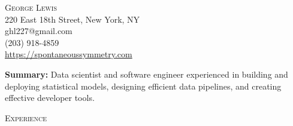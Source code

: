 \documentclass[9pt]{article}
\newenvironment{changemargin}[2]{%
  \begin{list}{}{%
    \setlength{\topsep}{0pt}%
    \setlength{\leftmargin}{#1}%
    \setlength{\rightmargin}{#2}%
    \setlength{\listparindent}{\parindent}%
    \setlength{\itemindent}{\parindent}%
    \setlength{\parsep}{\parskip}%
  }%
  \item[]}{\end{list}
}
\newcommand{\lineover}{
  \begin{changemargin}{-0.05in}{-0.05in}
    \vspace*{-8pt}
    \hrulefill \\
    \vspace*{-2pt}
  \end{changemargin}
}
\newcommand{\header}[1]{
  \begin{changemargin}{-0.5in}{-0.5in}
    \scshape{#1}
    \lineover
  \end{changemargin}
}
\newcommand{\contact}[5]{
  \begin{changemargin}{-0.5in}{-0.5in}
    \begin{center}
      {\Large \scshape {#1}} \\ \smallskip
      {#2} \\ \smallskip
      {#3} \\ \smallskip
      {#4} \\ \smallskip
      {#5} \\ \smallskip
    \end{center}
  \end{changemargin}
}
\newenvironment{body} {
  \vspace*{-16pt}
\begin{changemargin}{-0.25in}{-0.5in}
  }
{\end{changemargin}
}
\begin{document}
\contact{George Lewis}
        {220 East 18th Street, New York, NY}
        {ghl227@gmail.com}
        {(203) 918-4859}
        {\url{https://spontaneoussymmetry.com}}
\smallskip

\begin{body}
  \vspace{14pt}
  \textbf{Summary:}{} Data scientist and software engineer experienced in building and deploying statistical models, designing efficient data pipelines, and creating effective developer tools.

\end{body}

\smallskip

\header{Experience}
\end{document}
